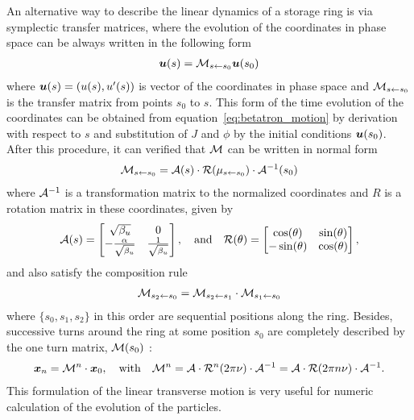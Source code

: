	An alternative way to describe the linear dynamics of a storage ring is via symplectic transfer matrices, where the evolution of the coordinates in phase space can be always written in the following form
	\begin{align}
		\boldsymbol{u}(s) = \mathcal{M}_{s\gets s_0} \boldsymbol{u}(s_0)
	\end{align}
	where $\boldsymbol{u}(s) = \left(u(s), u'(s)\right)$ is vector of the coordinates in phase space and $\mathcal{M}_{s\gets s_0}$ is the transfer matrix from points $s_0$ to $s$. This form of the time evolution of the coordinates can be obtained from equation~\eqref{eq:betatron_motion} by derivation with respect to $s$ and substitution of $J$ and $\phi$ by the initial conditions $\boldsymbol{u}(s_0)$. After this procedure, it can verified that $\mathcal{M}$ can be written in normal form~\cite{Bengtsson1997}
	\begin{align}
		\mathcal{M}_{s\gets s_0} = \mathcal{A}(s)\cdot\mathcal{R}(\mu_{s\gets s_0})\cdot\mathcal{A}^{-1}(s_0)
	\end{align}
	where $\mathcal{A}^{-1}$ is a transformation matrix to the normalized coordinates and $R$ is a rotation matrix in these coordinates, given by
	\begin{align}
        \mathcal{A}(s) =
                \begin{bmatrix}
                    \sqrt{\beta_u}                 & 0\\
                    -\frac{\alpha}{\sqrt{\beta_u}} & \frac{1}{\sqrt{\beta_u}}
                \end{bmatrix},
				\quad\text{and}\quad
        \mathcal{R}(\theta) =
				\begin{bmatrix}
					\cos(\theta)  & \sin(\theta)\\
					-\sin(\theta) & \cos(\theta)
				\end{bmatrix},
	\end{align}
	and also satisfy the composition rule
	\begin{align}
		\mathcal{M}_{s_2\gets s_0} = \mathcal{M}_{s_2\gets s_1}\cdot\mathcal{M}_{s_1\gets s_0}
	\end{align}
	where $\{s_0, s_1, s_2\}$ in this order are sequential positions along the ring. Besides, successive turns around the ring at some position $s_0$ are completely described by the one turn matrix, $\mathcal{M}(s_0)$ :
	\begin{align}
		\boldsymbol{x}_n = \mathcal{M}^n \cdot \boldsymbol{x}_0, \quad \text{with} \quad
		\mathcal{M}^n = \mathcal{A}\cdot\mathcal{R}^n(2\pi\nu)\cdot\mathcal{A}^{-1} =
					    \mathcal{A}\cdot\mathcal{R}(2\pi n \nu)\cdot\mathcal{A}^{-1}.
	\end{align}
    This formulation of the linear transverse motion is very useful for numeric calculation of the evolution of the particles.

